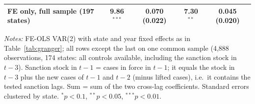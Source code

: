 \begin{table}[htbp]
\begin{threeparttable}
\begin{tabular}{lcccc}
\quad FE only, full sample (197 states) & 9.86$^{***}$ & 0.070 (0.022) & 7.30$^{**}$ & 0.045 (0.020) \\
\bottomrule
\end{tabular}
\begin{tablenotes}[flushleft]\footnotesize
\item \textit{Notes:} FE-OLS VAR(2) with state and year fixed effects as in Table~\ref{tab:granger}; all rows except the last on one common sample (4,888 observations, 174 states: all controls available, including the sanction stock in $t-3$). Sanction stock in $t-1$ = cases in force in $t-1$; it equals the stock in $t-3$ plus the new cases of $t-1$ and $t-2$ (minus lifted cases), i.e.\ it contains the tested sanction lags. Sum = sum of the two cross-lag coefficients. Standard errors clustered by state. $^{*}p<0.1$, $^{**}p<0.05$, $^{***}p<0.01$.
\end{tablenotes}
\end{threeparttable}
\end{table}
